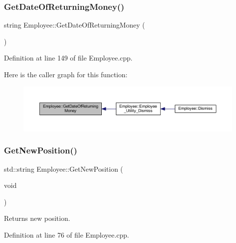 \subsubsection{\texorpdfstring{Get\+Date\+Of\+Returning\+Money()}{GetDateOfReturningMoney()}}
{\footnotesize\ttfamily string Employee\+::\+Get\+Date\+Of\+Returning\+Money (\begin{DoxyParamCaption}{ }\end{DoxyParamCaption})}



Definition at line 149 of file Employee.\+cpp.

Here is the caller graph for this function\+:
\nopagebreak
\begin{figure}[H]
\begin{center}
\leavevmode
\includegraphics[width=350pt]{class_employee_a7782178746f3640942450a0f7271ef60_icgraph}
\end{center}
\end{figure}
\mbox{\label{class_employee_ae210ea3433b4596f9d3ff5dee4c63bc2}} 
\subsubsection{\texorpdfstring{Get\+New\+Position()}{GetNewPosition()}}
{\footnotesize\ttfamily std\+::string Employee\+::\+Get\+New\+Position (\begin{DoxyParamCaption}\item[{void}]{ }\end{DoxyParamCaption})}



Returns new position. 



Definition at line 76 of file Employee.\+cpp.

\mbox{\label{class_employee_a8ad22e912e2e4e336416df20480ceb54}} 
